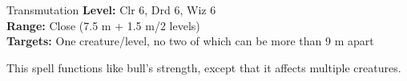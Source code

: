 {Transmutation}
{
	\textbf{Level:}
	Clr 6, Drd 6, Wiz 6\\
	\textbf{Range:}
	Close (7.5 m + 1.5 m/2 levels)\\
	\textbf{Targets:}
	One creature/level, no two of which can be more than 9 m apart\\
}
{
	This spell functions like bull's strength, except that it affects multiple creatures.

}
